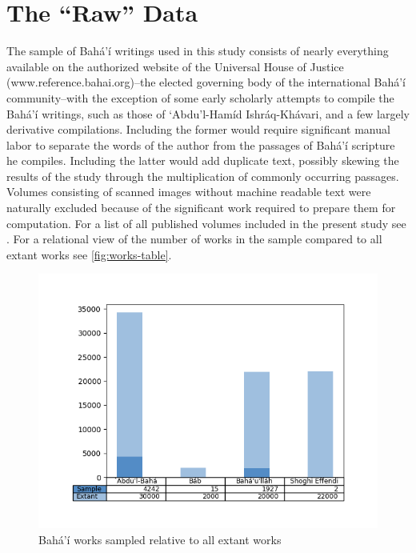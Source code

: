 \documentclass[12pt, oneside]{report}
\begin{document}
\section{The ``Raw'' Data}
\par
The sample of Bah\'{a}'\'{i}  writings used in this study consists of nearly everything available on the authorized website of the Universal House of Justice (www.reference.bahai.org)–the elected governing body of the international  Bah\'{a}'\'{i} community–with the exception of some early scholarly attempts to compile the Bah\'{a}'\'{i} writings, such as those of `Abdu'l-Ham\'{i}d Ishr\'{a}q-Kh\'{a}vari, and a few largely derivative compilations. Including the former would require significant manual labor to separate the words of the author from the passages of Bah\'{a}'\'{i} scripture he compiles. Including the latter would add duplicate text, possibly skewing the results of the study through the multiplication of commonly occurring passages. Volumes consisting of scanned images without machine readable text were naturally excluded because of the significant work required to prepare them for computation. For a list of all published volumes included in the present study see . For a relational view of the number of works in the sample compared to all extant works see \autoref{fig:works-table}.
\begin{figure}[htb]
\centering
\includegraphics[width=15cm]{figures/works-table.png}
\caption[Bah\'{a}'\'{i} works sampled relative to all extant works]{Bah\'{a}'\'{i} works sampled relative to all extant works}
\label{fig:works-table}
\end{figure}
\end{document}
